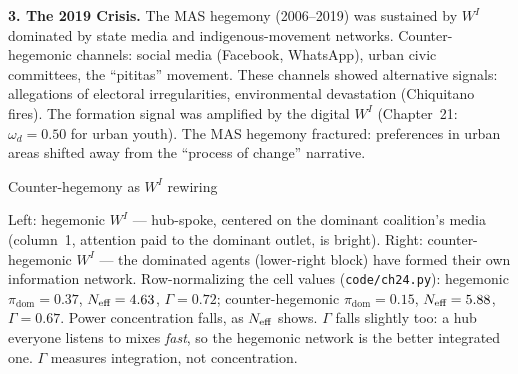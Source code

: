 \documentclass[../structural_economics_book.tex]{subfiles}
\begin{document}
\begin{example}
\textbf{3. The 2019 Crisis.} The MAS hegemony (2006--2019) was sustained by $W^I$ dominated by state media and indigenous-movement networks. Counter-hegemonic channels: social media (Facebook, WhatsApp), urban civic committees, the ``pititas'' movement. These channels showed alternative signals: allegations of electoral irregularities, environmental devastation (Chiquitano fires). The formation signal was amplified by the digital $W^I$ (Chapter~21: $\omega_d = 0.50$ for urban youth). The MAS hegemony fractured: preferences in urban areas shifted away from the ``process of change'' narrative.
\end{example}

\begin{vizpanel}{Counter-hegemony as $W^I$ rewiring}
\begin{center}
\end{center}
\vspace{-0.5em}
\small Left: hegemonic $W^I$ --- hub-spoke, centered on the dominant coalition's media (column~1, attention paid to the dominant outlet, is bright). Right: counter-hegemonic $W^I$ --- the dominated agents (lower-right block) have formed their own information network. Row-normalizing the cell values (\texttt{code/ch24.py}): hegemonic $\pi_{\text{dom}} = 0.37$, $N_{\text{eff}} = 4.63$, $\Gamma = 0.72$; counter-hegemonic $\pi_{\text{dom}} = 0.15$, $N_{\text{eff}} = 5.88$, $\Gamma = 0.67$. Power concentration falls, as $N_{\text{eff}}$ shows. $\Gamma$ falls slightly too: a hub everyone listens to mixes \emph{fast}, so the hegemonic network is the better integrated one. $\Gamma$ measures integration, not concentration.
\end{vizpanel}
\end{document}
